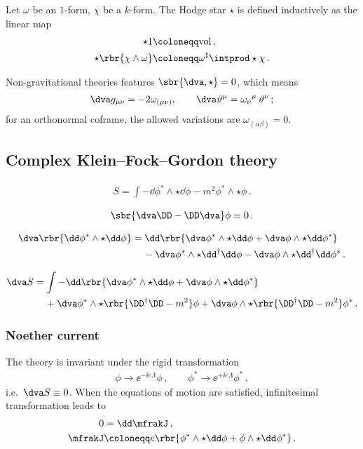 \documentclass[a4paper]{article}
\begin{document}
Let $\omega$ be an $1$-form, $\chi$ be a $k$-form. The Hodge star
$\star$ is defined inductively as the linear map \cite[sec.\ 24]{Burke1985}
\begin{align}
\star 1 &\coloneqq \mathrm{vol}\,, \\
\star\rbr{\chi\wedge\omega} &\coloneqq \omega^{\sharp} \intprod \star\chi\,.
\label{eq:hodge-100}
\end{align}

Non-gravitational theories features $\sbr{\dva, \star} = 0$, which means
\cite[sec.\ 3.2]{Muench1998}
\begin{align}
\dva g_{\mu\nu} = -2\omega_{(\mu\nu)},\qquad 
\dva\vartheta^{\mu} = \omega_{\nu}{}^{\mu}\,\vartheta^{\nu}\,;
\end{align}
for an orthonormal coframe, the allowed variations are 
$\omega_{(\alpha\beta)} = 0$.

\subsection{Complex Klein--Fock--Gordon theory}
\begin{align}
S = \int -\dd\phi^*\wedge\star\dd\phi - m^2 \phi^*\wedge\star\phi\,.
\end{align}

\begin{align}
\sbr{\dva \DD - \DD \dva }\phi = 0\,.
\end{align}

\begin{align}
\begin{split}
\dva \rbr{\dd \phi^*\wedge\star\dd\phi} &= 
\dd\rbr{\dva\phi^*\wedge\star\dd\phi + \dva\phi\wedge\star\dd\phi^*}
\\
&\quad\,-
\dva\phi^*\wedge\star\dd^{\dagger}\dd\phi -
\dva\phi\wedge\star\dd^{\dagger}\dd\phi^*\,.
\end{split}
\end{align}

\begin{align}
\dva S &=
\int -\dd\rbr{\dva\phi^*\wedge\star\dd\phi +
\dva\phi\wedge\star\dd\phi^*}
\nonumber \\
&\quad\,+
\dva\phi^*\wedge\star\rbr{\DD^{\dagger}\DD-m^2}\phi +
\dva\phi\wedge\star\rbr{\DD^{\dagger}\DD-m^2}\phi^*\,.
\end{align}


\subsubsection{Noether current}
The theory is invariant under the rigid transformation
\begin{align}
\phi \to \ee^{-\ii e \Lambda} \phi\,,\qquad
\phi^* \to \ee^{+\ii e \Lambda} \phi^*\,,
\end{align}
i.e.\ $\dva S \equiv 0$. When the equations of motion are satisfied, infinitesimal 
transformation leads to
\begin{align}
0 &= \dd \mfrakJ\,,
\\
\mfrakJ &\coloneqq e\rbr{\phi^*\wedge\star\dd\phi +
\phi\wedge\star\dd\phi^*}\,.
\end{align}
\end{document}

